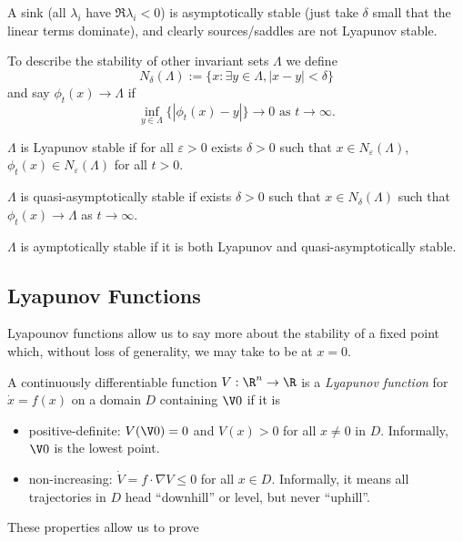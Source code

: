 \documentclass[a4paper]{article}
\begin{document}
\begin{eg}
  A sink (all \(\lambda_i\) have \(\Re \lambda_i<0\)) is asymptotically stable (just take \(\delta\) small that the linear terms dominate), and clearly sources/saddles are not Lyapunov stable.
\end{eg}

To describe the stability of other invariant sets \(\Lambda\) we define
\[
  N_\delta(\Lambda) := \{x: \exists y\in\Lambda, |x-y|<\delta \}
\]
and say \(\phi_t(x)\to \Lambda\) if
\[
  \inf_{y\in \Lambda}\{|\phi_t(x)-y|\}\to 0 \text{ as } t\to \infty.
\]

\begin{definition}
  \(\Lambda\) is Lyapunov stable if for all \(\varepsilon>0\) exists \(\delta>0\) such that \(x\in N_\varepsilon(\Lambda)\), \(\phi_t(x) \in N_\varepsilon(\Lambda)\) for all \(t>0\).

  \(\Lambda\) is quasi-asymptotically stable if exists \(\delta>0\) such that \(x\in N_\delta(\Lambda)\) such that \(\phi_t(x)\to \Lambda\) as \(t\to \infty\).

  \(\Lambda\) is aymptotically stable if it is both Lyapunov and quasi-asymptotically stable.
\end{definition}

\subsection{Lyapunov Functions}

Lyapounov functions allow us to say more about the stability of a fixed point which, without loss of generality, we may take to be at \(x=0\).

\begin{definition}
  A continuously differentiable function \(V:\R^n\to \R\) is a \emph{Lyapunov function} for \(\dot{x} = f(x)\) on a domain \(D\) containing \(\V 0\) if it is
  \begin{itemize}
  \item positive-definite: \(V(\V 0) = 0\) and \(V(x) >0\) for all \(x\neq 0\) in \(D\). Informally, \(\V 0\) is the lowest point.
  \item non-increasing: \(\dot{V} = f\cdot\nabla V \leq 0\) for all \(x\in D\). Informally, it means all trajectories in \(D\) head ``downhill'' or level, but never ``uphill''.
  \end{itemize}
\end{definition}

These properties allow us to prove
\end{document}
